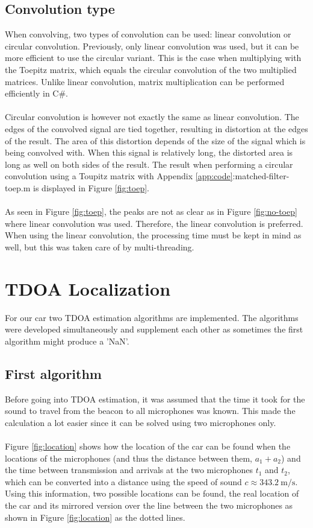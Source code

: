 \documentclass[final]{scrreprt} %
\begin{document}
\subsection{Convolution type}
When convolving, two types of convolution can be used: linear convolution or circular convolution.
Previously, only linear convolution was used, but it can be more efficient to use the circular variant.
This is the case when multiplying with the Toepitz matrix, which equals the circular convolution of the two multiplied matrices.
Unlike linear convolution, matrix multiplication can be performed efficiently in C\#.
\\ \\
Circular convolution is however not exactly the same as linear convolution.
The edges of the convolved signal are tied together, resulting in distortion at the edges of the result.
The area of this distortion depends of the size of the signal which is being convolved with.
When this signal is relatively long, the distorted area is long as well on both sides of the result.
The result when performing a circular convolution using a Toupitz matrix with Appendix \ref{app:code}:matched-filter-toep.m is displayed in Figure \ref{fig:toep}.
\\ \\
As seen in Figure \ref{fig:toep}, the peaks are not as clear as in Figure \ref{fig:no-toep} where linear convolution was used.
Therefore, the linear convolution is preferred.
When using the linear convolution, the processing time must be kept in mind as well, but this was taken care of by multi-threading.

\section{TDOA Localization}
For our car two TDOA estimation algorithms are implemented.
The algorithms were developed simultaneously and supplement each other as sometimes the first algorithm might produce a 'NaN'.

\subsection{First algorithm}
Before going into TDOA estimation, it was assumed that the time it took for the sound to travel from the beacon to all microphones was known.
This made the calculation a lot easier since it can be solved using two microphones only.
\\ \\
Figure \ref{fig:location} shows how the location of the car can be found when the locations of the microphones (and thus the distance between them, $a_1 + a_2$) and the time between transmission and arrivals at the two microphones $t_1$ and $t_2$, which can be converted into a distance using the speed of sound $c \approx \SI{343.2}{\metre\per\second}$.
Using this information, two possible locations can be found, the real location of the car and its mirrored version over the line between the two microphones as shown in Figure \ref{fig:location} as the dotted lines.
\end{document}
